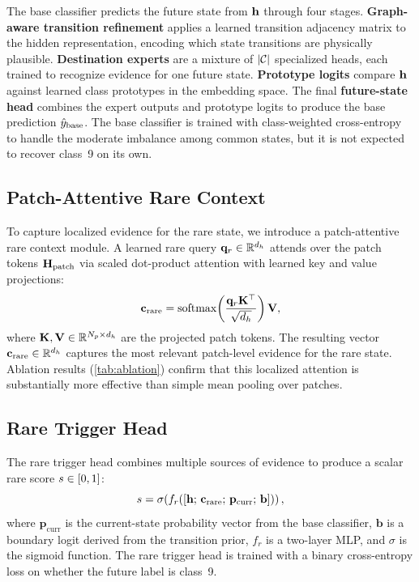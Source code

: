 The base classifier predicts the future state from $\mathbf{h}$ through four stages.
\textbf{Graph-aware transition refinement} applies a learned transition adjacency matrix to the hidden representation, encoding which state transitions are physically plausible.
\textbf{Destination experts} are a mixture of $|\mathcal{C}|$ specialized heads, each trained to recognize evidence for one future state.
\textbf{Prototype logits} compare $\mathbf{h}$ against learned class prototypes in the embedding space.
The final \textbf{future-state head} combines the expert outputs and prototype logits to produce the base prediction $\hat{y}_{\mathrm{base}}$.
The base classifier is trained with class-weighted cross-entropy to handle the moderate imbalance among common states, but it is not expected to recover class~9 on its own.

\subsection{Patch-Attentive Rare Context}

To capture localized evidence for the rare state, we introduce a patch-attentive rare context module.
A learned rare query $\mathbf{q}_r \in \mathbb{R}^{d_h}$ attends over the patch tokens $\mathbf{H}_{\mathrm{patch}}$ via scaled dot-product attention with learned key and value projections:
\begin{equation}
  \mathbf{c}_{\mathrm{rare}} = \operatorname{softmax}\!\left(\frac{\mathbf{q}_r \mathbf{K}^\top}{\sqrt{d_h}}\right) \mathbf{V},
\end{equation}
where $\mathbf{K}, \mathbf{V} \in \mathbb{R}^{N_p \times d_h}$ are the projected patch tokens.
The resulting vector $\mathbf{c}_{\mathrm{rare}} \in \mathbb{R}^{d_h}$ captures the most relevant patch-level evidence for the rare state.
Ablation results (\cref{tab:ablation}) confirm that this localized attention is substantially more effective than simple mean pooling over patches.

\subsection{Rare Trigger Head}

The rare trigger head combines multiple sources of evidence to produce a scalar rare score $s \in [0, 1]$:
\begin{equation}
  s = \sigma\!\left(f_r\!\left([\mathbf{h};\, \mathbf{c}_{\mathrm{rare}};\, \mathbf{p}_{\mathrm{curr}};\, \mathbf{b}]\right)\right),
\end{equation}
where $\mathbf{p}_{\mathrm{curr}}$ is the current-state probability vector from the base classifier, $\mathbf{b}$ is a boundary logit derived from the transition prior, $f_r$ is a two-layer MLP, and $\sigma$ is the sigmoid function.
The rare trigger head is trained with a binary cross-entropy loss on whether the future label is class~9.

